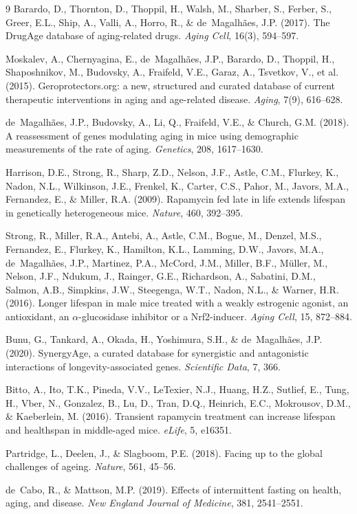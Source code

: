 \documentclass[11pt]{article}
\begin{document}
\begin{thebibliography}{9}
Barardo, D., Thornton, D., Thoppil, H., Walsh, M., Sharber, S., Ferber, S., Greer, E.L., Ship, A., Valli, A., Horro, R., \& de~Magalh\~aes, J.P. (2017).
The DrugAge database of aging-related drugs.
\textit{Aging Cell}, 16(3), 594--597.

Moskalev, A., Chernyagina, E., de~Magalh\~aes, J.P., Barardo, D., Thoppil, H., Shaposhnikov, M., Budovsky, A., Fraifeld, V.E., Garaz, A., Tsvetkov, V., et al. (2015).
Geroprotectors.org: a new, structured and curated database of current therapeutic interventions in aging and age-related disease.
\textit{Aging}, 7(9), 616--628.

de~Magalh\~aes, J.P., Budovsky, A., Li, Q., Fraifeld, V.E., \& Church, G.M. (2018).
A reassessment of genes modulating aging in mice using demographic measurements of the rate of aging.
\textit{Genetics}, 208, 1617--1630.

Harrison, D.E., Strong, R., Sharp, Z.D., Nelson, J.F., Astle, C.M., Flurkey, K., Nadon, N.L., Wilkinson, J.E., Frenkel, K., Carter, C.S., Pahor, M., Javors, M.A., Fernandez, E., \& Miller, R.A. (2009).
Rapamycin fed late in life extends lifespan in genetically heterogeneous mice.
\textit{Nature}, 460, 392--395.

Strong, R., Miller, R.A., Antebi, A., Astle, C.M., Bogue, M., Denzel, M.S., Fernandez, E., Flurkey, K., Hamilton, K.L., Lamming, D.W., Javors, M.A., de~Magalh\~aes, J.P., Martinez, P.A., McCord, J.M., Miller, B.F., M\"uller, M., Nelson, J.F., Ndukum, J., Rainger, G.E., Richardson, A., Sabatini, D.M., Salmon, A.B., Simpkins, J.W., Steegenga, W.T., Nadon, N.L., \& Warner, H.R. (2016).
Longer lifespan in male mice treated with a weakly estrogenic agonist, an antioxidant, an $\alpha$-glucosidase inhibitor or a Nrf2-inducer.
\textit{Aging Cell}, 15, 872--884.

Bunu, G., Tankard, A., Okada, H., Yoshimura, S.H., \& de~Magalh\~aes, J.P. (2020).
SynergyAge, a curated database for synergistic and antagonistic interactions of longevity-associated genes.
\textit{Scientific Data}, 7, 366.

Bitto, A., Ito, T.K., Pineda, V.V., LeTexier, N.J., Huang, H.Z., Sutlief, E., Tung, H., Vber, N., Gonzalez, B., Lu, D., Tran, D.Q., Heinrich, E.C., Mokrousov, D.M., \& Kaeberlein, M. (2016).
Transient rapamycin treatment can increase lifespan and healthspan in middle-aged mice.
\textit{eLife}, 5, e16351.

Partridge, L., Deelen, J., \& Slagboom, P.E. (2018).
Facing up to the global challenges of ageing.
\textit{Nature}, 561, 45--56.

de~Cabo, R., \& Mattson, M.P. (2019).
Effects of intermittent fasting on health, aging, and disease.
\textit{New England Journal of Medicine}, 381, 2541--2551.
\end{thebibliography}
\end{document}
